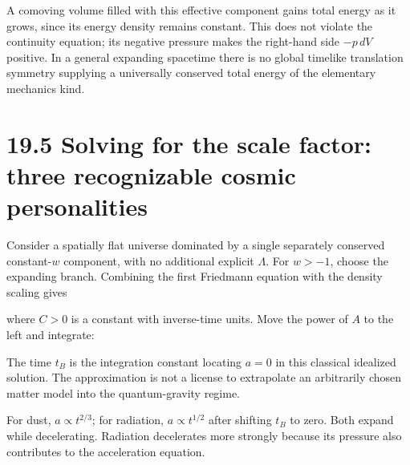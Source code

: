 \documentclass[
  11pt,
  letterpaper,
  oneside,
  openany]{scrbook}
\begin{document}
A comoving volume filled with this effective component gains total
energy as it grows, since its energy density remains constant. This does
not violate the continuity equation; its negative pressure makes the
right-hand side \(-p\,dV\) positive. In a general expanding spacetime
there is no global timelike translation symmetry supplying a universally
conserved total energy of the elementary mechanics kind.

\hypertarget{solving-for-the-scale-factor-three-recognizable-cosmic-personalities}{%
\section{19.5 Solving for the scale factor: three recognizable cosmic
personalities}\label{solving-for-the-scale-factor-three-recognizable-cosmic-personalities}}

Consider a spatially flat universe dominated by a single separately
conserved constant-\(w\) component, with no additional explicit
\(\Lambda\). For \(w>-1\), choose the expanding branch. Combining the
first Friedmann equation with the density scaling gives

\begin{center}
\begingroup
{}
\ifdim\wd\grmathbox>\linewidth
\resizebox{\linewidth}{!}{\usebox{\grmathbox}}
\else\usebox{\grmathbox}\fi
\endgroup
\end{center}

where \(C>0\) is a constant with inverse-time units. Move the power of
\(A\) to the left and integrate:

\begin{center}
\begingroup
{}
\ifdim\wd\grmathbox>\linewidth
\resizebox{\linewidth}{!}{\usebox{\grmathbox}}
\else\usebox{\grmathbox}\fi
\endgroup
\end{center}

The time \(t_B\) is the integration constant locating \(a=0\) in this
classical idealized solution. The approximation is not a license to
extrapolate an arbitrarily chosen matter model into the quantum-gravity
regime.

For dust, \(a\propto t^{2/3}\); for radiation, \(a\propto t^{1/2}\)
after shifting \(t_B\) to zero. Both expand while decelerating.
Radiation decelerates more strongly because its pressure also
contributes to the acceleration equation.
\end{document}
